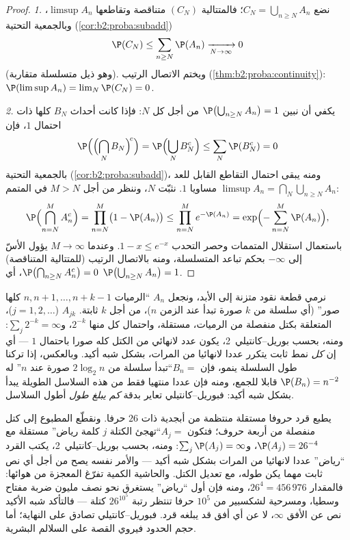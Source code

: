 \begin{proof}
\emph{1.} نضع $C_N = \bigcup_{n \geq N}A_n$؛ فالمتتالية $(C_N)$ متناقصة وتقاطعها $\limsup A_n$،
وبالجمعية التحتية  (\cref{cor:b2:proba:subadd})
\[
\P(C_N) \leq \sum_{n \geq N}\P(A_n)
\xrightarrow[N\to\infty]{} 0
\]
(وهو ذيل متسلسلة متقاربة). ويختم الاتصال الرتيب (\cref{thm:b2:proba:continuity}): $\P(\limsup A_n) =
\lim_N \P(C_N) = 0$.

\emph{2.} يكفي أن نبين $\P\bigl(\bigcup_{n\geq N}A_n\bigr)
= 1$ من أجل كل $N$: فإذا كانت أحداث
$B_N$ كلها ذات احتمال $1$، فإن
\[
\P\Bigl(\Bigl(\bigcap_NB_N\Bigr)^{\!c}\Bigr)
= \P\Bigl(\bigcup_NB_N^c\Bigr)
\leq \sum_N\P(B_N^c) = 0
\]
بالجمعية التحتية  (\cref{cor:b2:proba:subadd})، ومنه يبقى احتمال التقاطع
القابل للعد $\limsup A_n = \bigcap_N\bigcup_{n\geq N}A_n$ مساويا $1$. نثبّت $N$، وننظر من أجل $M > N$
في المتمم:
\[
\P\Bigl(\bigcap_{n=N}^{M} A_n^c\Bigr)
= \prod_{n=N}^{M}\bigl(1 - \P(A_n)\bigr)
\leq \prod_{n=N}^{M} e^{-\P(A_n)}
= \exp\Bigl(-\sum_{n=N}^M \P(A_n)\Bigr) ,
\]
باستعمال استقلال المتممات وحصر التحدب $1 -
x \leq e^{-x}$. وعندما $M \to \infty$ يؤول
الأسّ إلى $-\infty$ بحكم تباعد المتسلسلة، ومنه بالاتصال الرتيب
(للمتتالية المتناقصة) $\P\bigl(\bigcap_{n \geq N}A_n^c\bigr) = 0$، أي $\P\bigl(\bigcup_{n \geq N}A_n\bigr) = 1$.
\end{proof}

\begin{example}\label{ex:b2:proba:runs}
نرمي قطعة نقود متزنة إلى الأبد، ونجعل $A_n$  ``الرميات $n,
n+1, \dots, n + k - 1$
كلها صور'' (أي سلسلة من $k$ صورة تبدأ عند الزمن $n$)، من أجل
$k$ ثابتة.  $A_{jk}$ ($j =
1, 2, \dots$)، المتعلقة بكتل منفصلة من
الرميات، مستقلة، واحتمال كل منها $2^{-k}$، و$\sum_j 2^{-k} =
\infty$: ومنه، بحسب
بوريل--كانتيلي~2، يكون عدد لانهائي من الكتل كله صورا باحتمال $1$
--- أي إن \emph{كل} نمط ثابت يتكرر عددا لانهائيا من المرات، بشكل شبه
أكيد. وبالعكس، إذا تركنا طول السلسلة ينمو، فإن $B_n = {}$``تبدأ سلسلة
من $2\log_2 n$ صورة عند $n$'' له $\P(B_n) = n^{-2}$ قابلا للجمع، ومنه فإن عددا
منتهيا فقط من هذه السلاسل الطويلة يبدأ بشكل شبه أكيد: فبوريل--كانتيلي
تعاير بدقة \emph{كم يبلغ طول} أطول السلاسل.
\end{example}

\begin{example}
يطبع قرد حروفا مستقلة منتظمة من أبجدية ذات $26$ حرفا. ونقطّع
المطبوع إلى كتل منفصلة من أربعة حروف؛ فتكون  $A_j = {}$``تهجئ
الكتلة $j$ كلمة رياض'' مستقلة مع $\P(A_j) = 26^{-4}$، و$\sum_j\P(A_j) = \infty$: ومنه، بحسب
بوريل--كانتيلي~2، يكتب القرد ``رياض'' عددا لانهائيا من المرات بشكل
شبه أكيد --- والأمر نفسه يصح من أجل أي نص ثابت مهما يكن طوله، مع
تعديل الكتل. والحاشية الكمية تفرّغ المعجزة من هوائها: فالمقدار
$26^4 =
456\,976$، ومنه فإن أول ``رياض'' يستغرق نحو نصف مليون ضربة مفتاح وسطيا،
ومسرحية لشكسبير من $10^5$ حرفا تنتظر رتبة $26^{10^5}$ كتلة --- فالتأكد
شبه الأكيد نص عن الأفق $\infty$، لا عن أي أفق قد يبلغه قرد. فبوريل--كانتيلي
تصادق على النهاية؛ أما حجم الحدود فيروي القصة على السلالم البشرية.
\end{example}

